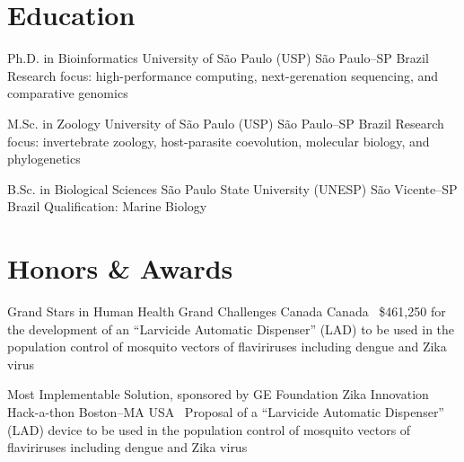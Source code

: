 \documentclass[11pt, letterpaper, sans]{moderncv}
\begin{document}


\restoregeometry

\clearpage


\section{Education}

		{Ph.D. in Bioinformatics}
		{University of São Paulo (USP)}
		{São Paulo--SP}
		{Brazil}
		{Research focus: high-performance computing, next-gerenation sequencing, and comparative genomics}

		{M.Sc. in Zoology}
		{University of São Paulo (USP)}
		{São Paulo--SP}
		{Brazil}
		{Research focus: invertebrate zoology, host-parasite coevolution, molecular biology, and phylogenetics}

		{B.Sc. in Biological Sciences}
		{São Paulo State University (UNESP)}
		{São Vicente--SP}
		{Brazil}
		{Qualification: Marine Biology}


\section{Honors \& Awards}

	{Grand Stars in Human Health}
	{Grand Challenges Canada}
	{Canada}
	{}
	{\textbullet~\$461,250 for the development of an ``Larvicide Automatic Dispenser'' (LAD) to be used in the population control of mosquito vectors of flaviriruses including dengue and Zika virus}

\cventry{---}
	{Most Implementable Solution, sponsored by GE Foundation}
	{Zika Innovation Hack-a-thon}
	{Boston--MA}
	{USA}
	{\textbullet~Proposal of a ``Larvicide Automatic Dispenser'' (LAD) device to be used in the population control of mosquito vectors of flaviriruses including dengue and Zika virus}
\end{document}
